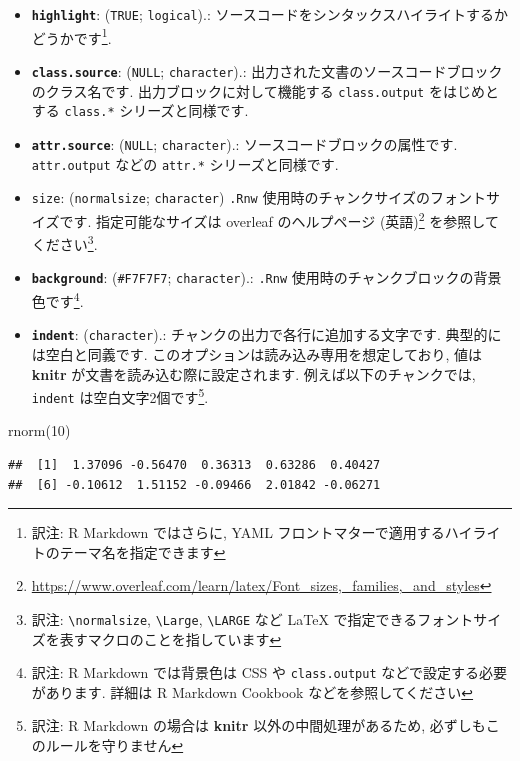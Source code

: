\documentclass[
  11pt,
]{bxjsreport}
\newenvironment{Shaded}{\begin{snugshade}}{\end{snugshade}}
\newcommand{\DecValTok}[1]{\textcolor[rgb]{0.00,0.00,0.81}{#1}}
\newcommand{\FunctionTok}[1]{\textcolor[rgb]{0.00,0.00,0.00}{#1}}
\newcommand{\NormalTok}[1]{#1}
\renewcommand{\href}[2]{#2\footnote{\url{#1}}}
\begin{document}
\begin{itemize}
\item
  \textbf{\texttt{highlight}}: (\texttt{TRUE}; \texttt{logical}).: ソースコードをシンタックスハイライトするかどうかです\footnote{訳注: R Markdown ではさらに, YAML フロントマターで適用するハイライトのテーマ名を指定できます}.
\item
  \textbf{\texttt{class.source}}: (\texttt{NULL}; \texttt{character}).: 出力された文書のソースコードブロックのクラス名です. 出力ブロックに対して機能する \texttt{class.output} をはじめとする \texttt{class.*} シリーズと同様です.
\item
  \textbf{\texttt{attr.source}}: (\texttt{NULL}; \texttt{character}).: ソースコードブロックの属性です. \texttt{attr.output} などの \texttt{attr.*} シリーズと同様です.
\item
  \texttt{size}: (\texttt{\textquotesingle{}normalsize\textquotesingle{}}; \texttt{character}) \texttt{.Rnw} 使用時のチャンクサイズのフォントサイズです. 指定可能なサイズは \href{https://www.overleaf.com/learn/latex/Font_sizes,_families,_and_styles}{overleaf のヘルプページ (英語)} を参照してください\footnote{訳注: \texttt{\textbackslash{}normalsize}, \texttt{\textbackslash{}Large}, \texttt{\textbackslash{}LARGE} など LaTeX で指定できるフォントサイズを表すマクロのことを指しています}.
\item
  \textbf{\texttt{background}}: (\texttt{\textquotesingle{}\#F7F7F7\textquotesingle{}}; \texttt{character}).: \texttt{.Rnw} 使用時のチャンクブロックの背景色です\footnote{訳注: R Markdown では背景色は CSS や \texttt{class.output} などで設定する必要があります. 詳細は R Markdown Cookbook などを参照してください}.
\item
  \textbf{\texttt{indent}}: (\texttt{character}).: チャンクの出力で各行に追加する文字です. 典型的には空白と同義です. このオプションは読み込み専用を想定しており, 値は \textbf{knitr} が文書を読み込む際に設定されます. 例えば以下のチャンクでは, \texttt{indent} は空白文字2個です\footnote{訳注: R Markdown の場合は \textbf{knitr} 以外の中間処理があるため, 必ずしもこのルールを守りません}.
\end{itemize}

\begin{Shaded}
\begin{Highlighting}[numbers=left,,]
\FunctionTok{rnorm}\NormalTok{(}\DecValTok{10}\NormalTok{)}
\end{Highlighting}
\end{Shaded}

\begin{verbatim}
##  [1]  1.37096 -0.56470  0.36313  0.63286  0.40427
##  [6] -0.10612  1.51152 -0.09466  2.01842 -0.06271
\end{verbatim}
\end{document}
